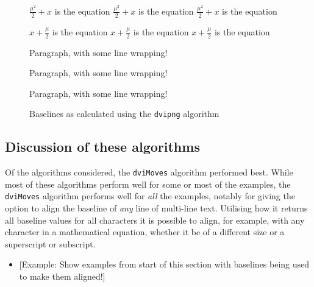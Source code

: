 \documentclass[]{article}
\providecommand{\tightlist}{%
  \setlength{\itemsep}{0pt}\setlength{\parskip}{0pt}}
\begin{document}
\begin{figure}
\begin{center}
\vspace{0.3cm}
\settodepth{\dvidepth} {$\frac{\mu^2}{2} + x$ is the equation}%
\settowidth{\dviwidth} {$\frac{\mu^2}{2} + x$ is the equation}%
\raisebox{\dimexpr -\dvidepth+0.0520833333333333in}{\makebox[0in][l]{\rule{\dviwidth}{.1pt}}}%
$\frac{\mu^2}{2} + x$ is the equation

\vspace{0.3cm}
\settodepth{\dvidepth} {$x + \frac{\mu}{2}$ is the equation}%
\settowidth{\dviwidth} {$x + \frac{\mu}{2}$ is the equation}%
\raisebox{\dimexpr -\dvidepth+0.0520833333333333in}{\makebox[0in][l]{\rule{\dviwidth}{.1pt}}}%
$x + \frac{\mu}{2}$ is the equation

\vspace{0.3cm}
\settodepth{\dvidepth} {\begin{minipage}{1in}Paragraph, with some line wrapping!\end{minipage}}%
\settowidth{\dviwidth} {\begin{minipage}{1in}Paragraph, with some line wrapping!\end{minipage}}%
\raisebox{\dimexpr -\dvidepth+0.208333333333333in}{\makebox[0in][l]{\rule{\dviwidth}{.1pt}}}%
\begin{minipage}{1in}Paragraph, with some line wrapping!\end{minipage}

\vspace{0.3cm}
\end{center}
\caption{Baselines as calculated using the \texttt{dvipng} algorithm}
\end{figure}

\subsection{Discussion of these
algorithms}\label{discussion-of-these-algorithms}

Of the algorithms considered, the \texttt{dviMoves} algorithm performed
best. While most of these algorithms perform well for some or most of
the examples, the \texttt{dviMoves} algorithm performs well for
\emph{all} the examples, notably for giving the option to align the
baseline of \emph{any} line of multi-line text. Utilising how it returns
all baseline values for all characters it is possible to align, for
example, with any character in a mathematical equation, whether it be of
a different size or a superscript or subscript.

\begin{itemize}
\tightlist
\item
  {[}Example: Show examples from start of this section with baselines
  being used to make them aligned!{]}
\end{itemize}
\end{document}
